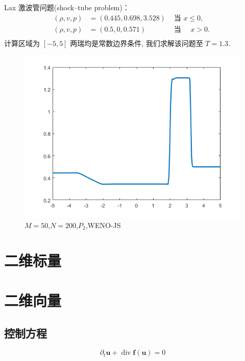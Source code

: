 \documentclass{book}
\begin{document}
\begin{example}
  Lax 激波管问题(shock–tube problem)\cite{RN109}：
  \begin{equation}
    \begin{aligned}
      (\rho, v, p) & =(0.445,0.698,3.528) & \text { 当 } x \leqslant 0 \text {, } \\
      (\rho, v, p) & =(0.5,0,0.571) \quad & \text { 当 } \quad x>0 \text {. }     \\
    \end{aligned}
  \end{equation}
  计算区域为 $[-5,5]$ 两瑞均是常数边界条件, 我们求解该问题至 $T=1.3$.
  \begin{figure}[htp]
    \centering
    \label{fig:}
    \includegraphics[width=0.7\linewidth]{fig/lax_problem.png}
    \caption{$M=50$,$N=200$,$P_2$,WENO-JS}
  \end{figure}

\end{example}
\section{二维标量}

\section{二维向量}
\subsection{控制方程}
\begin{equation}
  \partial_{t} \boldsymbol{u}+\operatorname{div} \boldsymbol{f} (\boldsymbol{u})=0
\end{equation}
\end{document}

